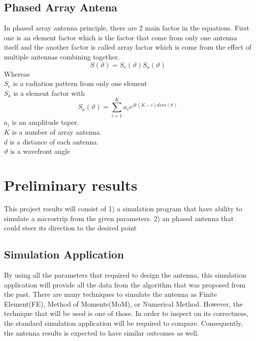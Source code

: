 \documentclass[11pt,a4paper]{article}
\begin{document}
  \newpage

    \subsection{Phased Array Antena}
      In phased array antenna principle, there are 2 main factor in the equations. First one is an element factor which is the factor that come from only one antenna itself and the another factor is called array factor which is come from the effect of multiple antennas combining together.
      \begin{equation} 
        S(\vartheta)=S_{e}(\vartheta)S_a(\vartheta)  \label{ii}
      \end{equation}
        Whereas \\[1ex]
        \indent $S_{e}$ is a radiation pattern from only one element\\
        \indent $S_{a}$ is a element factor with
        \begin{equation} 
          S_{a}(\vartheta) = \sum\limits_{i=1}^K a_{i}e^{jk(K-i)dsin(\vartheta)}
        \end{equation}
        \indent $a_{i}$ is an amplitude taper.\\
        \indent $K$ is a number of array antenna.\\
        \indent $d$ is a distance of each antenna.\\
        \indent $\vartheta$ is a wavefront angle

  \newpage

  \section{Preliminary results}
    \indent This project results will consist of
    1) a simulation program that have ability  to simulate a microstrip from the given parameters.
    2) an phased antenna that could steer its direction to the desired point 
    
    \subsection{Simulation Application}
      \indent By using all the parameters that required to design the antenna, this simulation application will provide
              all the data from the algorithm that was proposed from the past. There are many techniques to simulate the antenna
              as Finite Element(FE), Method of Moments(MoM), or Numerical Method. However, the technique that will be used is one
              of those. In order to inspect on its correctness, the standard simulation application will be required to 
              compare. Consequently, the antenna results is expected to have similar outcomes as well.
    
\end{document}
